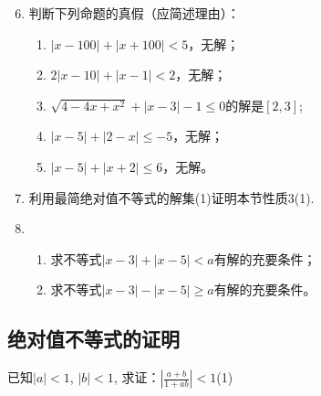 \begin{enumerate}\setcounter{enumi}{5}
    \item 判断下列命题的真假（应简述理由）：
\begin{enumerate}[(1)]
    \item $|x-100|+|x+100|<5$，无解；
    \item $2|x-10|+|x-1|<2$，无解；
    \item $\sqrt{4-4x+x^2}+|x-3|-1\le 0$的解是$[2,3]$;
    \item $|x-5|+|2-x|\le -5$，无解；
    \item $|x-5|+|x+2|\le 6$，无解。
\end{enumerate}

\item 利用最简绝对值不等式的解集(1)证明本节性质3(1).
\item \begin{enumerate}[(1)]
    \item 求不等式$|x-3|+|x-5|<a$有解的充要条件；
    \item 求不等式$|x-3|-|x-5|\ge a$有解的充要条件。
\end{enumerate}
\end{enumerate}

\subsection{绝对值不等式的证明}
\begin{example}
    已知$|a|<1$, $|b|<1$, 
求证：$\left|\frac{a+b}{1+ab}\right|<1$\hfill (1)
\end{example}

